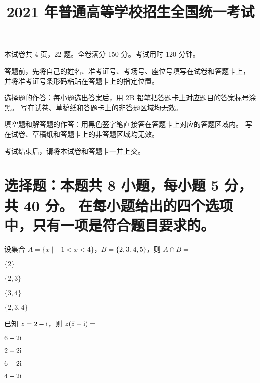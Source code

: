 \documentclass[zihao = -4]{exam-zh}
\begin{document}
\title{2021 年普通高等学校招生全国统一考试}

\subject{数学}

\maketitle

本试卷共 4 页，22 题。全卷满分 150 分。考试用时 120 分钟。

\goodluck

\begin{notice}
  \item 答题前，先将自己的姓名、准考证号、考场号、座位号填写在试卷和答题卡上，
    并将准考证号条形码粘贴在答题卡上的指定位置。
  \item 选择题的作答：每小题选出答案后，用 2B 铅笔把答题卡上对应题目的答案标号涂黑。
    写在试卷、草稿纸和答题卡上的非答题区域均无效。
  \item 填空题和解答题的作答：用黑色签字笔直接答在答题卡上对应的答题区域内。
    写在试卷、草稿纸和答题卡上的非答题区域均无效。
  \item 考试结束后，请将本试卷和答题卡一并上交。
\end{notice}



\section{%
  选择题：本题共 8 小题，每小题 5 分，共 40 分。
  在每小题给出的四个选项中，只有一项是符合题目要求的。
}

\begin{question}
  设集合 $A = \{x \mid -1 < x < 4\}$，$B = \{2, 3, 4, 5\}$，则 $A \cap B = $ \paren[B]

  \begin{choices}
    \item $\{2\}$
    \item $\{2, 3\}$
    \item $\{3, 4\}$
    \item $\{2, 3, 4\}$
  \end{choices}
\end{question}

\begin{question}
  已知 $z = 2 - \mathrm{ i }$，则 $z (\bar{z} + \mathrm{ i }) = $ \paren
  \begin{choices}
    \item $6 - 2\mathrm{ i }$
    \item $2 - 2\mathrm{ i }$
    \item $6 + 2\mathrm{ i }$
    \item $4 + 2\mathrm{ i }$
  \end{choices}
\end{question}
\end{document}
